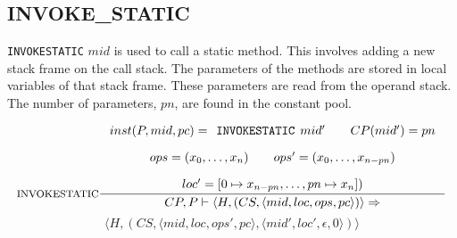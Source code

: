 \subsection{INVOKE\_STATIC}
\texttt{INVOKESTATIC} $mid$ is used to call a static method.
This involves adding a new stack frame on the call stack.
The parameters of the methods are stored in local variables of that stack frame.
These parameters are read from the operand stack.
The number of parameters, $pn$, are found in the constant pool. 

$$\inference[INVOKESTATIC]{
inst(P,mid,pc) = \texttt{INVOKESTATIC }mid' \semsp 
CP(mid') = pn \semnl \\
ops = (x_0, \ldots, x_n) \semsp
ops' = (x_0, \ldots, x_{n-pn}) \semnl\\
loc' = [0 \mapsto x_{n-pn}, \ldots, pn \mapsto x_n])}
{CP, P \vdash \langle H, (CS, \langle mid, loc, ops, pc \rangle)\rangle \Rightarrow }$$
$$\langle H, (CS, \langle mid, loc, ops', pc \rangle, \langle mid', loc', \epsilon, 0 \rangle)\rangle$$
